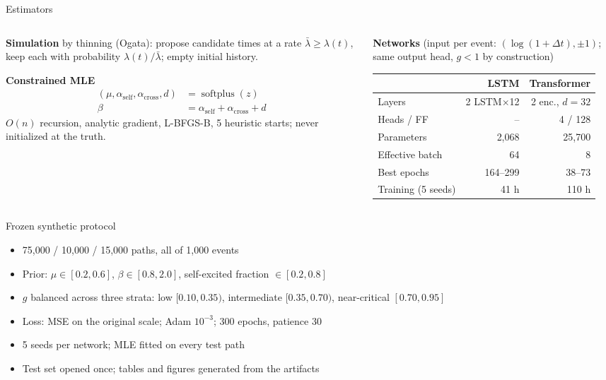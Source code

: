 \documentclass[aspectratio=169,11pt]{beamer}
\newcommand{\aself}{\alpha_{\mathrm{self}}}
\newcommand{\across}{\alpha_{\mathrm{cross}}}
\begin{document}
\begin{frame}{Estimators}
  \begin{columns}[T]
    \begin{column}{0.44\textwidth}
      \textbf{Simulation} by thinning (Ogata): propose candidate times at a rate
      \(\bar\lambda\ge\lambda(t)\), keep each with probability \(\lambda(t)/\bar\lambda\);
      empty initial history.
      \par\medskip
      \textbf{Constrained MLE}
      \[
        \begin{aligned}
        (\mu,\aself,\across,d)&=\operatorname{softplus}(z)\\
        \beta&=\aself+\across+d
        \end{aligned}
      \]
      \(O(n)\) recursion, analytic gradient, L-BFGS-B, 5 heuristic starts; never initialized
      at the truth.
    \end{column}
    \begin{column}{0.54\textwidth}
      \textbf{Networks} (input per event: \((\log(1+\Delta t),\pm1)\); same output head,
      \(g<1\) by construction)
      \par\smallskip
      \footnotesize
      \begin{tabular}{lrr}
        \toprule
         & LSTM & Transformer\\
        \midrule
        Layers & 2 LSTM\(\times\)12 & 2 enc., \(d{=}32\)\\
        Heads / FF & -- & 4 / 128\\
        Parameters & 2,068 & 25,700\\
        Effective batch & 64 & 8\\
        Best epochs & 164--299 & 38--73\\
        Training (5 seeds) & 41 h & 110 h\\
        \bottomrule
      \end{tabular}
    \end{column}
  \end{columns}
\end{frame}

\begin{frame}{Frozen synthetic protocol}
  \begin{itemize}
    \item 75,000 / 10,000 / 15,000 paths, all of 1,000 events
    \item Prior: \(\mu\in[0.2,0.6]\), \(\beta\in[0.8,2.0]\), self-excited fraction
          \(\in[0.2,0.8]\)
    \item \(g\) balanced across three strata: low \([0.10,0.35)\), intermediate
          \([0.35,0.70)\), near-critical \([0.70,0.95]\)
    \item Loss: MSE on the original scale; Adam \(10^{-3}\); 300 epochs, patience 30
    \item 5 seeds per network; MLE fitted on every test path
    \item Test set opened once; tables and figures generated from the artifacts
  \end{itemize}
\end{frame}
\end{document}
